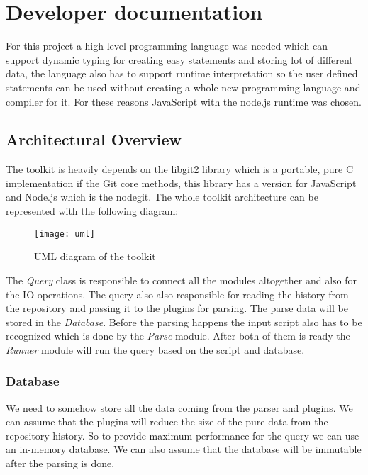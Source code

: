 \chapter{Developer documentation}
\label{ch:impl}

For this project a high level programming language was needed which can support dynamic typing for creating easy statements and storing
lot of different data, the language also has to support runtime interpretation so the user defined statements can be used without
creating a whole new programming language and compiler for it. For these reasons JavaScript with the node.js runtime was chosen. 

\newpage

\section{Architectural Overview}

The toolkit is heavily depends on the libgit2 \cite{libgit2} library which is a portable, pure C implementation  if the Git core methods,
this library has a version for JavaScript and Node.js which is the nodegit\cite{nodegit}.
The whole toolkit architecture can be represented with the following diagram:

\begin{figure}[H]
	\centering
	\texttt{[image: uml]}
	\caption{UML diagram of the toolkit}
	\label{fig:fig-help}
\end{figure}

The \textit{Query} class is responsible to connect all the modules altogether and also for the IO operations. The query also also
responsible for reading the history from the repository and passing it to the plugins for parsing. The parse data will be stored
in the \textit{Database}. Before the parsing happens the input script also has to be recognized which is done by the \textit{Parse}
module. After both of them is ready the \textit{Runner} module will run the query based on the script and database.
\newpage

\subsection{Database}

We need to somehow store all the data coming from the parser and plugins. We can assume that the plugins will reduce the size of the
pure data from the repository history. So to provide maximum performance for the query we can use an in-memory database. 
We can also assume that the database will be immutable after the parsing is done. 

